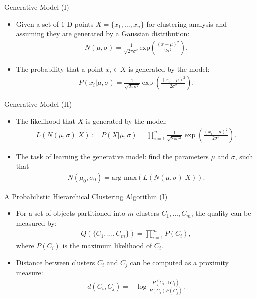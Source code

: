 \begin{frame}{Generative Model (I)}
	\centering
	\begin{itemize}
		\item Given a set of $1$-D points $X = \{x_1, \ldots, x_n\}$ for
		      clustering analysis and assuming they are generated by a Gaussian
		      distribution:
		      \begin{align}
			      N(\mu,\sigma) = \frac{1}{\sqrt{2 \pi \sigma^2}}
			      \text{exp}\left({\frac{(x-\mu)^2}{2\sigma^2}}\right).
		      \end{align}
		\item The probability that a point $x_i \in X$ is generated by the
		      model:
		      \begin{align}
			      P(x_i \vert \mu, \sigma) = \frac{1}{\sqrt{2\pi\sigma^2}} \exp\left(
			      \frac{(x_i-\mu)^2}{2\sigma^2}\right).
		      \end{align}
	\end{itemize}
\end{frame}

\begin{frame}{Generative Model (II)}
	\centering
	\begin{itemize}
		\item The likelihood that $X$ is generated by the model:
		      \begin{align}
			      L(N(\mu,\sigma) \vert X) := P(X \vert \mu, \sigma) =
			      \prod_{i=1}^{n} \frac{1}{\sqrt{2\pi\sigma^2}} \exp\left(
			      \frac{(x_i-\mu)^2}{2\sigma^2}\right).
		      \end{align}
		\item The task of learning the generative model: find the parameters
		      $\mu$ and $\sigma$, such that
		      \begin{align}
			      N(\mu_0,\sigma_0) = \text{arg max}\left( L(N(\mu,\sigma)\vert X)
			      \right).
		      \end{align}
	\end{itemize}
\end{frame}

\begin{frame}{A Probabilistic Hierarchical Clustering Algorithm (I)}
	\centering
	\begin{itemize}
		\item For a set of objects partitioned into $m$ clusters $C_1, \ldots,
			      C_m$,
		      the quality can be measured by:
		      \begin{align}
			      Q(\{C_1, \ldots, C_m\}) = \prod_{i=1}^{m} P(C_i),
		      \end{align}
		      where $P(C_i)$ is the maximum likelihood of $C_i$.
		\item Distance between clusters $C_i$ and $C_j$ can be computed as a
		      proximity measure:
		      \begin{align}
			      d(C_i,C_j) = - \log \frac{P(C_i \cup C_j)}{P(C_i)P(C_j)}.
		      \end{align}
	\end{itemize}
\end{frame}

